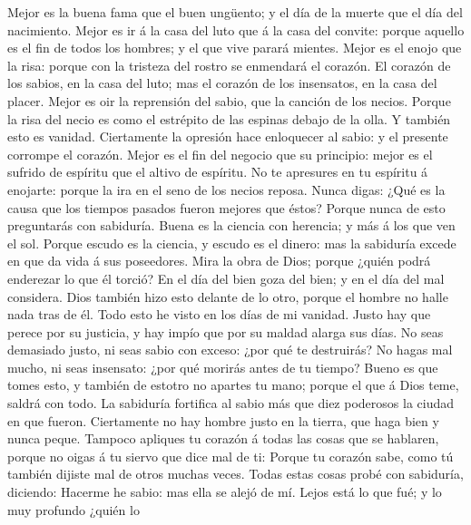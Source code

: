  Mejor es la buena fama que el buen ungüento; y el día de
la muerte que el día del nacimiento.  Mejor es ir á la
casa del luto que á la casa del convite: porque aquello es el fin de
todos los hombres; y el que vive parará mientes.  Mejor es
el enojo que la risa: porque con la tristeza del rostro se enmendará el
corazón.  El corazón de los sabios, en la casa del luto;
mas el corazón de los insensatos, en la casa del placer. 
Mejor es oir la reprensión del sabio, que la canción de los necios.
 Porque la risa del necio es como el estrépito de las
espinas debajo de la olla. Y también esto es vanidad. 
Ciertamente la opresión hace enloquecer al sabio: y el presente corrompe
el corazón.  Mejor es el fin del negocio que su principio:
mejor es el sufrido de espíritu que el altivo de espíritu.
 No te apresures en tu espíritu á enojarte: porque la ira
en el seno de los necios reposa.  Nunca digas: ¿Qué es la
causa que los tiempos pasados fueron mejores que éstos? Porque nunca de
esto preguntarás con sabiduría.  Buena es la ciencia con
herencia; y más á los que ven el sol.  Porque escudo es
la ciencia, y escudo es el dinero: mas la sabiduría excede en que da
vida á sus poseedores.  Mira la obra de Dios; porque
¿quién podrá enderezar lo que él torció?  En el día del
bien goza del bien; y en el día del mal considera. Dios también hizo
esto delante de lo otro, porque el hombre no halle nada tras de él.
 Todo esto he visto en los días de mi vanidad. Justo hay
que perece por su justicia, y hay impío que por su maldad alarga sus
días.  No seas demasiado justo, ni seas sabio con exceso:
¿por qué te destruirás?  No hagas mal mucho, ni seas
insensato: ¿por qué morirás antes de tu tiempo?  Bueno es
que tomes esto, y también de estotro no apartes tu mano; porque el que á
Dios teme, saldrá con todo.  La sabiduría fortifica al
sabio más que diez poderosos la ciudad en que fueron. 
Ciertamente no hay hombre justo en la tierra, que haga bien y nunca
peque.  Tampoco apliques tu corazón á todas las cosas que
se hablaren, porque no oigas á tu siervo que dice mal de ti:
 Porque tu corazón sabe, como tú también dijiste mal de
otros muchas veces.  Todas estas cosas probé con
sabiduría, diciendo: Hacerme he sabio: mas ella se alejó de mí.
 Lejos está lo que fué; y lo muy profundo ¿quién lo
